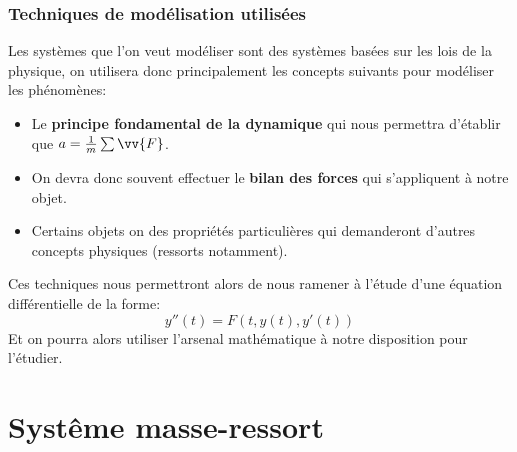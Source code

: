 \documentclass{report}
\begin{document}
      \subsection{Techniques de modélisation utilisées}
      Les systèmes que l'on veut modéliser sont des systèmes basées sur les lois de la physique, on utilisera donc principalement les concepts suivants pour modéliser les phénomènes:
      \begin{itemize}
         \item Le \textbf{principe fondamental de la dynamique} qui nous permettra d'établir que \(a = \frac{1}{m} \sum\vv{F}\).
         \item On devra donc souvent effectuer le \textbf{bilan des forces} qui s'appliquent à notre objet.
         \item Certains objets on des propriétés particulières qui demanderont d'autres concepts physiques (ressorts notamment).
      \end{itemize}
      Ces techniques nous permettront alors de nous ramener à l'étude d'une équation différentielle de la forme:
      \[
         y''(t) = F(t, y(t), y'(t))
      \]
      Et on pourra alors utiliser l'arsenal mathématique à notre disposition pour l'étudier.

   \chapter{Systême masse-ressort}
\end{document}
